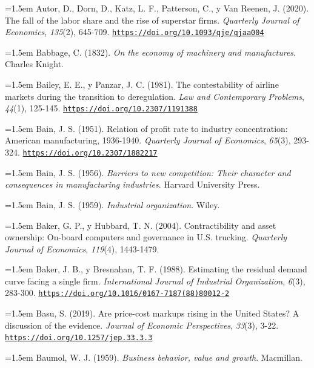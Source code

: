 \documentclass[10pt,a4paper]{article}
\begin{document}
\noindent\hangindent=1.5em Autor, D., Dorn, D., Katz, L. F., Patterson, C., y Van Reenen, J. (2020). The fall of the labor share and the rise of superstar firms. \textit{Quarterly Journal of Economics}, \textit{135}(2), 645-709. \href{https://doi.org/10.1093/qje/qjaa004}{\nolinkurl{https://doi.org/10.1093/qje/qjaa004}}

\noindent\hangindent=1.5em Babbage, C. (1832). \textit{On the economy of machinery and manufactures}. Charles Knight.

\noindent\hangindent=1.5em Bailey, E. E., y Panzar, J. C. (1981). The contestability of airline markets during the transition to deregulation. \textit{Law and Contemporary Problems}, \textit{44}(1), 125-145. \href{https://doi.org/10.2307/1191388}{\nolinkurl{https://doi.org/10.2307/1191388}}

\noindent\hangindent=1.5em Bain, J. S. (1951). Relation of profit rate to industry concentration: American manufacturing, 1936-1940. \textit{Quarterly Journal of Economics}, \textit{65}(3), 293-324. \href{https://doi.org/10.2307/1882217}{\nolinkurl{https://doi.org/10.2307/1882217}}

\noindent\hangindent=1.5em Bain, J. S. (1956). \textit{Barriers to new competition: Their character and consequences in manufacturing industries}. Harvard University Press.

\noindent\hangindent=1.5em Bain, J. S. (1959). \textit{Industrial organization}. Wiley.

\noindent\hangindent=1.5em Baker, G. P., y Hubbard, T. N. (2004). Contractibility and asset ownership: On-board computers and governance in U.S. trucking. \textit{Quarterly Journal of Economics}, \textit{119}(4), 1443-1479.

\noindent\hangindent=1.5em Baker, J. B., y Bresnahan, T. F. (1988). Estimating the residual demand curve facing a single firm. \textit{International Journal of Industrial Organization}, \textit{6}(3), 283-300. \href{https://doi.org/10.1016/0167-7187(88)80012-2}{\nolinkurl{https://doi.org/10.1016/0167-7187(88)80012-2}}

\noindent\hangindent=1.5em Basu, S. (2019). Are price-cost markups rising in the United States? A discussion of the evidence. \textit{Journal of Economic Perspectives}, \textit{33}(3), 3-22. \href{https://doi.org/10.1257/jep.33.3.3}{\nolinkurl{https://doi.org/10.1257/jep.33.3.3}}

\noindent\hangindent=1.5em Baumol, W. J. (1959). \textit{Business behavior, value and growth}. Macmillan.
\end{document}
